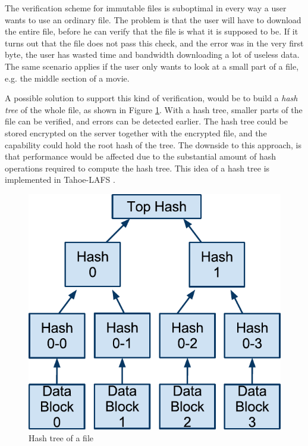 \documentclass[pdftex,english,10pt,b5paper,twoside]{book}
\begin{document}
The verification scheme for immutable files is suboptimal in every way a user
wants to use an ordinary file. The problem is that the user will have to
download the entire file, before he can verify that the file is what it is
supposed to be. If it turns out that the file does not pass this check, and the
error was in the very first byte, the user has wasted time and bandwidth
downloading a lot of useless data. The same scenario applies if the user only
wants to look at a small part of a file, e.g. the middle section of a movie.

A possible solution to support this kind of verification, would be to build a
\emph{hash tree} of the whole file, as shown in Figure \ref{fig:hashtree}. With
a hash tree, smaller parts of the file can be verified, and errors can be
detected earlier. The hash tree could be stored encrypted on the server
together with the encrypted file, and the capability could hold the root hash
of the tree. The downside to this approach, is that performance would be
affected due to the substantial amount of hash operations required to compute
the hash tree.  This idea of a hash tree is implemented in Tahoe-\ac{LAFS}
\cite{tahoe}.

\begin{figure}[!h]
\centering
\includegraphics[scale=0.55]{hash-tree.pdf}
\caption{Hash tree of a file}
\label{fig:hashtree}
\end{figure}
\end{document}

